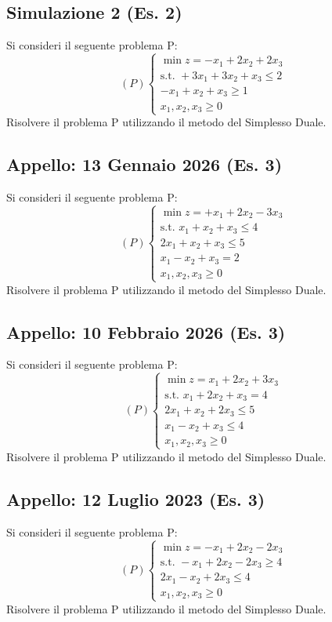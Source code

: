 \documentclass[11pt, a4paper]{article}
\begin{document}
\subsection{Simulazione 2 (Es. 2)}
Si consideri il seguente problema P:
\[ (P) \begin{cases} \min z = -x_1 + 2x_2 + 2x_3 \\ \text{s.t. } +3x_1 + 3x_2 + x_3 \le 2 \\ -x_1 + x_2 + x_3 \ge 1 \\ x_1, x_2, x_3 \ge 0 \end{cases} \]
Risolvere il problema P utilizzando il metodo del Simplesso Duale.

\subsection{Appello: 13 Gennaio 2026 (Es. 3)}
Si consideri il seguente problema P:
\[ (P) \begin{cases} \min z = +x_1 + 2x_2 - 3x_3 \\ \text{s.t. } x_1 + x_2 + x_3 \le 4 \\ 2x_1 + x_2 + x_3 \le 5 \\ x_1 - x_2 + x_3 = 2 \\ x_1, x_2, x_3 \ge 0 \end{cases} \]
Risolvere il problema P utilizzando il metodo del Simplesso Duale.

\subsection{Appello: 10 Febbraio 2026 (Es. 3)}
Si consideri il seguente problema P:
\[ (P) \begin{cases} \min z = x_1 + 2x_2 + 3x_3 \\ \text{s.t. } x_1 + 2x_2 + x_3 = 4 \\ 2x_1 + x_2 + 2x_3 \le 5 \\ x_1 - x_2 + x_3 \le 4 \\ x_1, x_2, x_3 \ge 0 \end{cases} \]
Risolvere il problema P utilizzando il metodo del Simplesso Duale.

\subsection{Appello: 12 Luglio 2023 (Es. 3)}
Si consideri il seguente problema P:
\[ (P) \begin{cases} \min z = -x_1 + 2x_2 - 2x_3 \\ \text{s.t. } -x_1 + 2x_2 - 2x_3 \ge 4 \\ 2x_1 - x_2 + 2x_3 \le 4 \\ x_1, x_2, x_3 \ge 0 \end{cases} \]
Risolvere il problema P utilizzando il metodo del Simplesso Duale.
\end{document}
